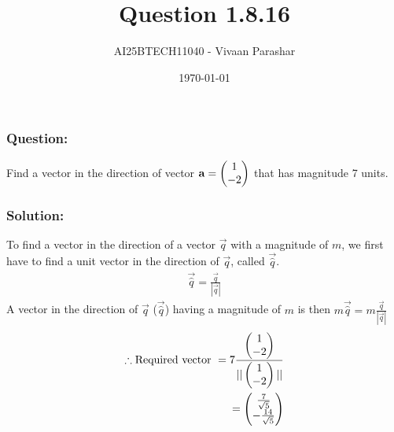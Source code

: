 \documentclass{beamer}
\title{Question 1.8.16}
\author{AI25BTECH11040 - Vivaan Parashar}
\date{\today}
\begin{document}
\frame{\titlepage}

\begin{frame}
    \frametitle{Question: }
    Find a vector in the direction of vector $\mathbf{a} = \begin{pmatrix}1 \\ -2\end{pmatrix}$ that has magnitude 7 units.
\end{frame}

\begin{frame}
    \frametitle{Solution: }

To find a vector in the direction of a vector $\vec{q}$ with a magnitude of $m$, we first have to find a unit vector in the direction of $\vec{q}$, called $\vec{\hat{q}}$.
\begin{align}
    \vec{\hat{q}} = \frac{\vec{q}}{|\vec{q}|}
\end{align}
A vector in the direction of $\vec{q}$ ($\vec{\hat{q}}$) having a magnitude of $m$ is then $m \vec{\hat{q}} = m\frac{\vec{q}}{|\vec{q}|}$
\begin{align}
    \therefore \text{Required vector } = 7\frac{\begin{pmatrix}1 \\ -2\end{pmatrix}}{||\begin{pmatrix}1 \\ -2\end{pmatrix}||}\\
    = \begin{pmatrix}\frac{7}{\sqrt{5}} \\ - \frac{14}{\sqrt{5}}\end{pmatrix}
\end{align}

\end{frame}
\end{document}

